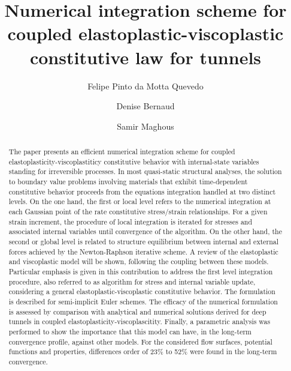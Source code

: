 \documentclass[Journal,letterpaper]{ascelike-new}
\begin{document}
\title{Numerical integration scheme for coupled elastoplastic-viscoplastic constitutive law for tunnels}

\author[1]{Felipe Pinto da Motta Quevedo}
\author[2]{Denise Bernaud}
\author[3]{Samir Maghous}


\maketitle

\begin{abstract}
The paper presents an efficient numerical integration scheme for coupled elastoplasticity-viscoplastiticy constitutive behavior with internal-state variables standing for irreversible processes. In most quasi-static structural analyses, the solution to boundary value problems involving materials that exhibit time-dependent constitutive behavior proceeds from the equations integration handled at two distinct levels. On the one hand, the first or local level refers to the numerical integration at each Gaussian point of the rate constitutive stress/strain relationships. For a given strain increment, the procedure of local integration is iterated for stresses and associated internal variables until convergence of the algorithm. On the other hand, the second or global level is related to structure equilibrium between internal and external forces achieved by the Newton-Raphson iterative scheme. A review of the elastoplastic and viscoplastic model will be shown, following the coupling between these models. Particular emphasis is given in this contribution to address the first level integration procedure, also referred to as algorithm for stress and internal variable update, considering a general elastoplastic-viscoplastic constitutive behavior. The formulation is described for semi-implicit Euler schemes. The efficacy of the numerical formulation is assessed by comparison with analytical and numerical solutions derived for deep tunnels in coupled elastoplasticity-viscoplascitity.  Finally, a parametric analysis was performed to show the importance that this model can have, in the long-term convergence profile, against other models. For the considered flow surfaces, potential functions and properties, differences order of 23\% to 52\% were found in the long-term convergence.
\end{abstract}
\end{document}
